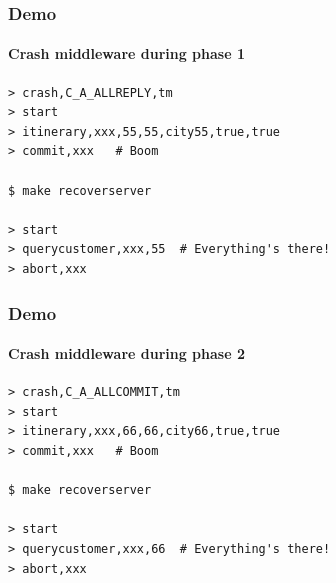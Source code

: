 \documentclass{beamer}
\begin{document}
\begin{frame}[fragile,t]
  \frametitle{Demo}
  \framesubtitle{Crash middleware during phase 1}

\begin{verbatim}
> crash,C_A_ALLREPLY,tm
> start
> itinerary,xxx,55,55,city55,true,true
> commit,xxx   # Boom

$ make recoverserver

> start
> querycustomer,xxx,55  # Everything's there!
> abort,xxx
\end{verbatim}
\end{frame}



\begin{frame}[fragile,t]
  \frametitle{Demo}
  \framesubtitle{Crash middleware during phase 2}

\begin{verbatim}
> crash,C_A_ALLCOMMIT,tm
> start
> itinerary,xxx,66,66,city66,true,true
> commit,xxx   # Boom

$ make recoverserver

> start
> querycustomer,xxx,66  # Everything's there!
> abort,xxx
\end{verbatim}
\end{frame}
\end{document}
